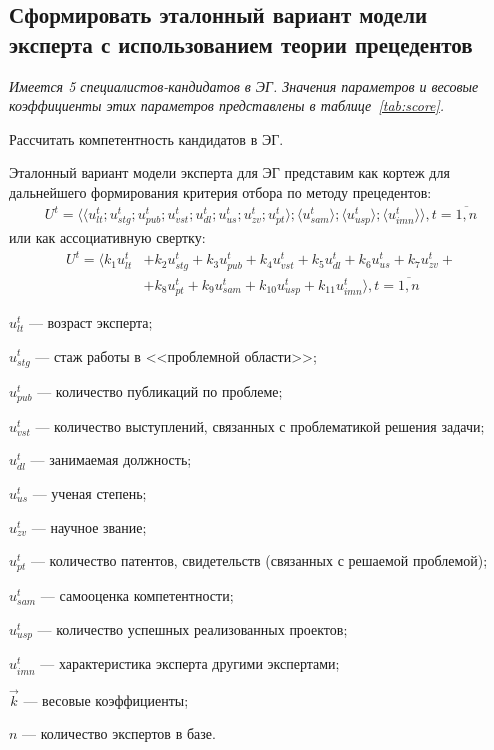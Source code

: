 \subsection{Сформировать эталонный вариант модели эксперта с использованием теории прецедентов}
{
	\itshape
	Имеется 5 специалистов-кандидатов в ЭГ.
	Значения параметров и весовые коэффициенты этих параметров представлены в таблице~\ref{tab:score}.

	Рассчитать компетентность кандидатов в ЭГ.
}

Эталонный вариант модели эксперта для ЭГ представим как кортеж  для дальнейшего формирования критерия отбора по методу прецедентов:
\begin{align*}
	U^t = \langle \langle u^t_{lt}; u^t_{stg}; u^t_{pub}; u^t_{vst}; u^t_{dl}; u^t_{us}; u^t_{zv}; u^t_{pt} \rangle ; \langle u^t_{sam} \rangle ; \langle u^t_{usp} \rangle ; \langle u^t_{imn} \rangle \rangle, t = \overline{1,n}
\end{align*}
или как ассоциативную свертку:
\begin{align*}
	U^t = \langle k_1 u^t_{lt} & + k_2 u^t_{stg} + k_3 u^t_{pub} + k_4 u^t_{vst} + k_5 u^t_{dl} + k_6 u^t_{us} + k_7 u^t_{zv}+ \\ &+ k_8 u^t_{pt} + k_9 u^t_{sam} + k_{10} u^t_{usp} + k_{11} u^t_{imn} \rangle, t = \overline{1,n}
\end{align*}
\begin{description}
	\item[где] $u^t_{lt}$ --- возраст эксперта;
	\item $u^t_{stg}$ --- стаж работы в <<проблемной области>>;
	\item $u^t_{pub}$ --- количество публикаций по проблеме;
	\item $u^t_{vst}$ --- количество выступлений, связанных с проблематикой решения задачи;
	\item $u^t_{dl}$ --- занимаемая должность;
	\item $u^t_{us}$ --- ученая степень;
	\item $u^t_{zv}$ --- научное звание;
	\item $u^t_{pt}$ --- количество патентов, свидетельств (связанных с решаемой проблемой);
	\item $u^t_{sam}$ --- самооценка компетентности;
	\item $u^t_{usp}$ --- количество успешных реализованных проектов;
	\item $u^t_{imn}$ --- характеристика эксперта другими экспертами;
	\item $\vec{k}$ --- весовые коэффициенты;
	\item $n$ --- количество экспертов в базе.
\end{description}

